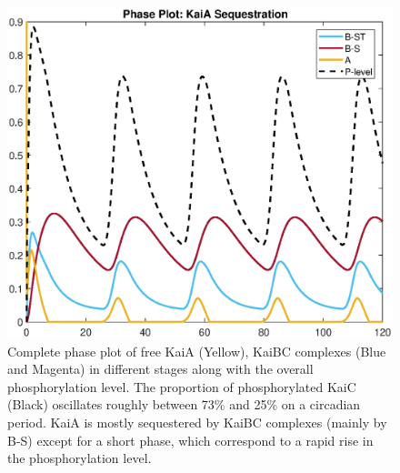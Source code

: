 \documentclass[a4paper,10pt]{article}
\numberwithin{equation}{section}
\begin{document}

\begin{figure}
\centering
\includegraphics[scale=0.8]{24_18127_Seq_A.eps}
\caption{\selectfont Complete phase plot of free KaiA (Yellow), KaiBC complexes (Blue and Magenta) in different stages along with the overall phosphorylation level. The proportion of phosphorylated KaiC (Black) oscillates roughly between  73\% and 25\% on a circadian period. KaiA is mostly sequestered by KaiBC complexes (mainly by B-S) except for a short phase, which correspond to a rapid rise in the phosphorylation level.}
\label{fig:model24_18127}
\end{figure}



\end{document}
